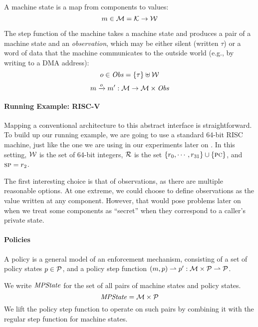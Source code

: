 \documentclass[acmsmall,review,anonymous]{acmart}\settopmatter{printfolios=true,printccs=false,printacmref=false}
\begin{document}
A machine state is a map from components to values:
%
\[m \in {\mathcal M} = {\mathcal K} \rightarrow {\mathcal W}\]

The step function of the
machine takes a machine state and produces a pair of a
machine state and an {\em observation}, which may be either
silent (written $\tau$) or a word of data that the machine communicates to
the outside world (e.g., by writing to a DMA address):
%
\[o \in \mathit{Obs} = \{\tau\} \uplus {\mathcal W}\]
\[m \xrightarrow{o} m' : {\mathcal M} \rightarrow {\mathcal M} \times \mathit{Obs} \]
%

\paragraph*{Running Example: RISC-V}

Mapping a conventional architecture to this abstract interface is
straightforward. To build up our running example, we are going to use
a standard 64-bit RISC machine, just like the one we are using in our
experiments later on . In this setting, ${\mathcal W}$
is the set of 64-bit integers, ${\mathcal R}$ is the set $\{r_0, \cdots,
r_{31}\} \cup \{\textsc{pc}\}$, and $\textsc{sp} = r_2$.

The first interesting choice is that of observations, as there are
multiple reasonable options. At one extreme, we could choose to define
observations as the value written at any component. However, that
would pose problems later on when we treat some components as ``secret''
when they correspond to a caller's private state.   

\paragraph*{Policies}

A policy is a general model of an enforcement mechanism, consisting of
a set of policy states \(p \in \mathcal{P}\), and a policy step function
\((m, p) \rightharpoonup p' : {\mathcal M} \times \mathcal{P}
\rightharpoonup \mathcal{P}\).

We write $\mathit{MPState}$ for the set of all pairs of machine states and policy
states.
%
\[\mathit{MPState} = {\mathcal M} \times \mathcal{P}\]
%
We lift the policy step function to operate on such pairs
by combining it with the regular step function for machine states.
\end{document}
